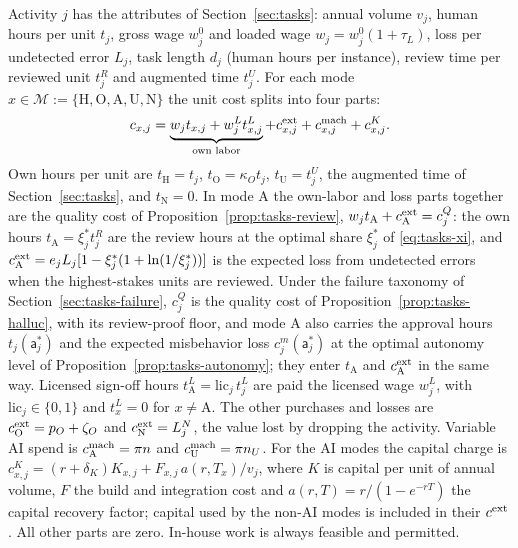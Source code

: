 \begin{assumption}\label{ass:ext-cost}
Activity $j$ has the attributes of Section~\ref{sec:tasks}: annual volume $v_j$, human hours per unit $t_j$, gross wage $w^0_j$ and loaded wage $w_j=w^0_j(1+\tau_L)$, loss per undetected error $L_j$, task length $d_j$ (human hours per instance), review time per reviewed unit $t^R_j$ and augmented time $t^U_j$. For each mode $x\in\mathcal M:=\{\mathrm H,\mathrm O,\mathrm A,\mathrm U,\mathrm N\}$ the unit cost splits into four parts:
\begin{equation}\label{eq:ext-split}
c_{x,j}=\underbrace{w_jt_{x,j}+w^L_jt^L_{x,j}}_{\text{own labor}}+c^{\rm ext}_{x,j}+c^{\rm mach}_{x,j}+c^{K}_{x,j}.
\end{equation}
Own hours per unit are $t_{\mathrm H}=t_j$, $t_{\mathrm O}=\kappa_Ot_j$, $t_{\mathrm U}=t^U_j$, the augmented time of Section~\ref{sec:tasks}, and $t_{\mathrm N}=0$. In mode A the own-labor and loss parts together are the quality cost of Proposition~\ref{prop:tasks-review}, $w_jt_{\mathrm A}+c^{\rm ext}_{\mathrm A}=c^Q_j$: the own hours $t_{\mathrm A}=\xi^*_jt^R_j$ are the review hours at the optimal share $\xi^*_j$ of \eqref{eq:tasks-xi}, and $c^{\rm ext}_{\mathrm A}=e_jL_j[1-\xi^*_j(1+\ln(1/\xi^*_j))]$ is the expected loss from undetected errors when the highest-stakes units are reviewed. Under the failure taxonomy of Section~\ref{sec:tasks-failure}, $c^Q_j$ is the quality cost of Proposition~\ref{prop:tasks-halluc}, with its review-proof floor, and mode A also carries the approval hours $t_j(\mathsf a^*_j)$ and the expected misbehavior loss $c^m_j(\mathsf a^*_j)$ at the optimal autonomy level of Proposition~\ref{prop:tasks-autonomy}; they enter $t_{\mathrm A}$ and $c^{\rm ext}_{\mathrm A}$ in the same way. Licensed sign-off hours $t^L_{\mathrm A}=\mathrm{lic}_j\,t^L_j$ are paid the licensed wage $w^L_j$, with $\mathrm{lic}_j\in\{0,1\}$ and $t^L_x=0$ for $x\neq\mathrm A$. The other purchases and losses are $c^{\rm ext}_{\mathrm O}=p_O+\zeta_O$ and $c^{\rm ext}_{\mathrm N}=L^N_j$, the value lost by dropping the activity. Variable AI spend is $c^{\rm mach}_{\mathrm A}=\pi n$ and $c^{\rm mach}_{\mathrm U}=\pi n_U$. For the AI modes the capital charge is $c^K_{x,j}=(r+\delta_K)K_{x,j}+F_{x,j}\,a(r,T_x)/v_j$, where $K$ is capital per unit of annual volume, $F$ the build and integration cost and $a(r,T)=r/(1-e^{-rT})$ the capital recovery factor; capital used by the non-AI modes is included in their $c^{\rm ext}$. All other parts are zero. In-house work is always feasible and permitted.
\end{assumption}

